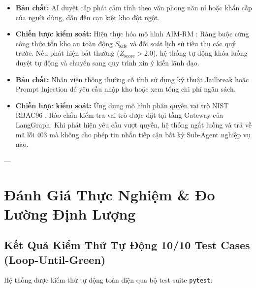 \documentclass[11pt,a4paper]{article}
\begin{document}
\begin{riskbox}
\begin{itemize}[leftmargin=1.5em]
    \item \textbf{Bản chất:} AI duyệt cấp phát cảm tính theo văn phong năn nỉ hoặc khẩn cấp của người dùng, dẫn đến cạn kiệt kho đột ngột.
    \item \textbf{Chiến lược kiểm soát:} Hiện thực hóa mô hình AIM-RM \cite{supplychain2026}: Ràng buộc cứng công thức tồn kho an toàn động $S_{\text{safe}}$ và đối soát lịch sử tiêu thụ các quý trước. Nếu phát hiện bất thường ($Z_{\text{score}} > 2.0$), hệ thống tự động khóa luồng duyệt tự động và chuyển sang quy trình xin ý kiến lãnh đạo.
\end{itemize}
\end{riskbox}

\begin{riskbox}
\begin{itemize}[leftmargin=1.5em]
    \item \textbf{Bản chất:} Nhân viên thông thường cố tình sử dụng kỹ thuật Jailbreak hoặc Prompt Injection để yêu cầu nhập kho hoặc xem tổng chi phí ngân sách.
    \item \textbf{Chiến lược kiểm soát:} Ứng dụng mô hình phân quyền vai trò NIST RBAC96 \cite{rbac1996}. Rào chắn kiểm tra vai trò được đặt tại tầng Gateway của LangGraph. Khi phát hiện yêu cầu vượt quyền, hệ thống ngắt luồng và trả về mã lỗi 403 mà không cho phép tin nhắn tiếp cận bất kỳ Sub-Agent nghiệp vụ nào.
\end{itemize}
\end{riskbox}

---

\section{Đánh Giá Thực Nghiệm \& Đo Lường Định Lượng}

\subsection{Kết Quả Kiểm Thử Tự Động 10/10 Test Cases (Loop-Until-Green)}
Hệ thống được kiểm thử tự động toàn diện qua bộ test suite \texttt{pytest}:
\end{document}
